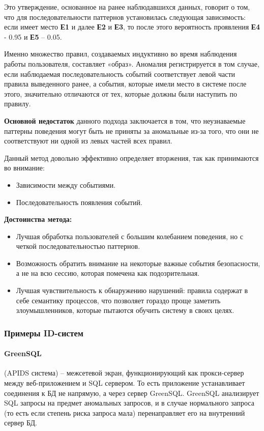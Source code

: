 Это утверждение, основанное на ранее наблюдавшихся данных, говорит о том, что для последовательности
паттернов установилась следующая зависимость: если имеет место \textbf{Е1} и далее \textbf{Е2} и \textbf{Е3},
то после этого вероятность проявления \textbf{Е4} - 0.95 и \textbf{Е5} – 0.05.

Именно множество правил, создаваемых индуктивно во время наблюдения работы пользователя, составляет «образ».
Аномалия регистрируется в том случае, если наблюдаемая последовательность событий соответствует левой
части правила выведенного ранее, а события, которые имели место в системе после этого,
значительно отличаются от тех, которые должны были наступить по правилу.

\textbf{Основной недостаток} данного подхода заключается в том, что неузнаваемые паттерны поведения могут
быть не приняты за аномальные из-за того, что они не соответствуют ни одной из левых частей
всех правил.\autocite{IDSystem}

Данный метод довольно эффективно определяет вторжения, так как принимаются во внимание:
\begin{itemize}
    \item Зависимости между событиями.
    \item Последовательность появления событий.
\end{itemize}

\textbf{Достоинства метода:}
\begin{itemize}
    \item Лучшая обработка пользователей с большим колебанием поведения, но с четкой
    последовательностью паттернов.
    \item Возможность обратить внимание на некоторые важные события безопасности, а не на всю сессию,
    которая помечена как подозрительная.
    \item Лучшая чувствительность к обнаружению нарушений: правила содержат в себе семантику процессов, что позволяет гораздо проще заметить злоумышленников, которые пытаются обучить систему в своих целях.
\end{itemize}
\autocite{IntrusionDetection}

\subsubsection{Примеры ID-систем}


\paragraph*{GreenSQL} (APIDS система) -- межсетевой экран, функционирующий как
прокси-сервер между веб-приложением и SQL сервером. То есть приложение устанавливает
соединения к БД не напрямую, а через сервер GreenSQL. GreenSQL анализирует SQL запросы
на предмет аномальных запросов, и в случае нормального запроса (то есть если степень
риска запроса мала) перенаправляет его на внутренний сервер БД.

